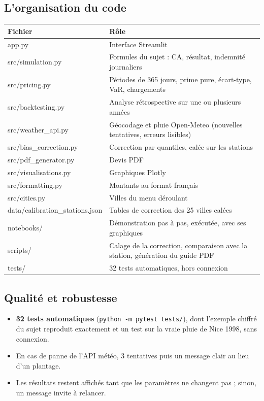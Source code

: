 \documentclass[11pt,a4paper]{article}
\begin{document}
\subsection{L'organisation du code}
\begin{table}[H]
\centering\small
\begin{tabularx}{\linewidth}{>{\ttfamily}lX}
\toprule
\normalfont Fichier & Rôle\\
\midrule
app.py & Interface Streamlit\\
src/simulation.py & Formules du sujet : CA, résultat, indemnité journaliers\\
src/pricing.py & Périodes de 365 jours, prime pure, écart-type, VaR, chargements\\
src/backtesting.py & Analyse rétrospective sur une ou plusieurs années\\
src/weather\_api.py & Géocodage et pluie Open-Meteo (nouvelles tentatives, erreurs lisibles)\\
src/bias\_correction.py & Correction par quantiles, calée sur les stations\\
src/pdf\_generator.py & Devis PDF\\
src/visualisations.py & Graphiques Plotly\\
src/formatting.py & Montants au format français\\
src/cities.py & Villes du menu déroulant\\
data/calibration\_stations.json & Tables de correction des 25 villes calées\\
notebooks/ & Démonstration pas à pas, exécutée, avec ses graphiques\\
scripts/ & Calage de la correction, comparaison avec la station, génération du guide PDF\\
tests/ & 32 tests automatiques, hors connexion\\
\bottomrule
\end{tabularx}
\end{table}

\subsection{Qualité et robustesse}
\begin{itemize}
  \item \textbf{32 tests automatiques} (\texttt{python -m pytest tests/}), dont l'exemple chiffré du sujet reproduit
        exactement et un test sur la vraie pluie de Nice 1998, sans connexion.
  \item En cas de panne de l'API météo, 3 tentatives puis un message clair au lieu d'un plantage.
  \item Les résultats restent affichés tant que les paramètres ne changent pas ; sinon, un message invite à relancer.
\end{itemize}
\end{document}
